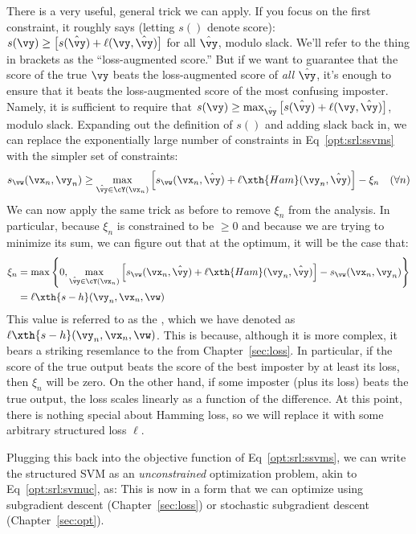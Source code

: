 There is a very useful, general trick we can apply.
If you focus on the first constraint, it roughly says (letting $s()$ denote score):
$s(\vy) \geq \big[ s(\hat\vy) + \ell(\vy,\hat\vy) \big]$ for all $\hat\vy$, modulo slack.
We'll refer to the thing in brackets as the ``loss-augmented score.''
But if we want to guarantee that the score of the true $\vy$ beats the loss-augmented score of \emph{all} $\hat\vy$, it's enough to ensure that it beats the loss-augmented score of the most confusing imposter.
Namely, it is sufficient to require that $s(\vy) \geq \max_{\hat\vy} \big[ s(\hat\vy) + \ell(\vy,\hat\vy) \big]$, modulo slack.
Expanding out the definition of $s()$ and adding slack back in, we can replace the exponentially large number of constraints in Eq~\eqref{opt:srl:ssvms} with the simpler set of constraints:
\begin{align}
   s_\vw(\vx_n,\vy_n) \geq
    \max_{\hat\vy \in \cY(\vx_n)} \Big[
    s_\vw(\vx_n, \hat\vy)
    + \ell\xth{Ham}(\vy_n, \hat\vy) \Big]
    - \xi_{n}\nonumber
 && (\forall n)
\end{align}
We can now apply the same trick as before to remove $\xi_n$ from the analysis.
In particular, because $\xi_n$ is constrained to be $\geq 0$ and because we are
trying to minimize its sum, we can figure out that at the optimum, it will be the case that:
\begin{align}
  \xi_n &=
    \max \left\{ 0,
    \max_{\hat\vy \in \cY(\vx_n)} \Big[
          s_\vw(\vx_n,\hat\vy)
    + \ell\xth{Ham}(\vy_n, \hat\vy) \Big]
    - %
          s_\vw(\vx_n,\vy_n)
          \right\} \\
  &= \ell\xth{s-h}(\vy_n, \vx_n, \vw)
\end{align}
This value is referred to as
the , which we have denoted as $\ell\xth{s-h}(\vy_n, \vx_n, \vw)$.
This is because, although it is more complex, it bears a striking resemlance to the  from Chapter~\ref{sec:loss}.
In particular, if the score of the true output beats the score of the best imposter by at least its loss, then $\xi_n$ will be zero.
On the other hand, if some imposter (plus its loss) beats the true output, the loss scales linearly as a function of the difference.
At this point, there is nothing special about Hamming loss, so we will replace it with some arbitrary structured loss $\ell$.

Plugging this back into the objective function of Eq~\eqref{opt:srl:ssvms}, we can write the structured SVM as an \emph{unconstrained} optimization problem, akin to Eq~\eqref{opt:srl:svmuc}, as:
%
%
This is now in a form that we can optimize using subgradient descent (Chapter~\ref{sec:loss}) or stochastic subgradient descent (Chapter~\ref{sec:opt}).

